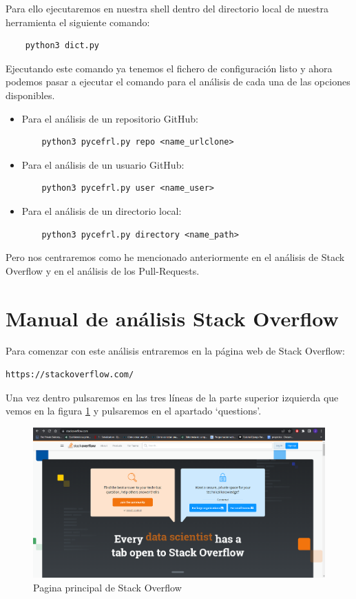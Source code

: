 \documentclass[a4paper, 12pt]{book}
\begin{document}
Para ello ejecutaremos en nuestra shell dentro del directorio local de nuestra herramienta el siguiente comando:

\begin{verbatim}
	python3 dict.py
\end{verbatim}

Ejecutando este comando ya tenemos el fichero de configuración listo y ahora podemos pasar a ejecutar el comando para el análisis de cada una de las opciones disponibles.

\begin{itemize}
	\item Para el análisis de un repositorio GitHub:
	\begin{verbatim}
	python3 pycefrl.py repo <name_urlclone>
	\end{verbatim}
	\item Para el análisis de un usuario GitHub:
	\begin{verbatim}
	python3 pycefrl.py user <name_user>
	\end{verbatim}
	\item Para el análisis de un directorio local:
	\begin{verbatim}
	python3 pycefrl.py directory <name_path>
	\end{verbatim}
\end{itemize}

Pero nos centraremos como he mencionado anteriormente en el análisis de Stack Overflow y en el análisis de los Pull-Requests.

\section{Manual de análisis Stack Overflow}

Para comenzar con este análisis entraremos en la página web de Stack Overflow:

\begin{verbatim}
https://stackoverflow.com/
\end{verbatim}

Una vez dentro pulsaremos en las tres líneas de la parte superior izquierda que vemos en la figura \ref{figura:stack1} y pulsaremos en el apartado `questions'.

\begin{figure}
    \includegraphics[bb=0 0 800 600, width=12cm, keepaspectratio]{img/stack1}
    \caption{Pagina principal de Stack Overflow}
    \label{figura:stack1}
 \end{figure}
 
\end{document}
